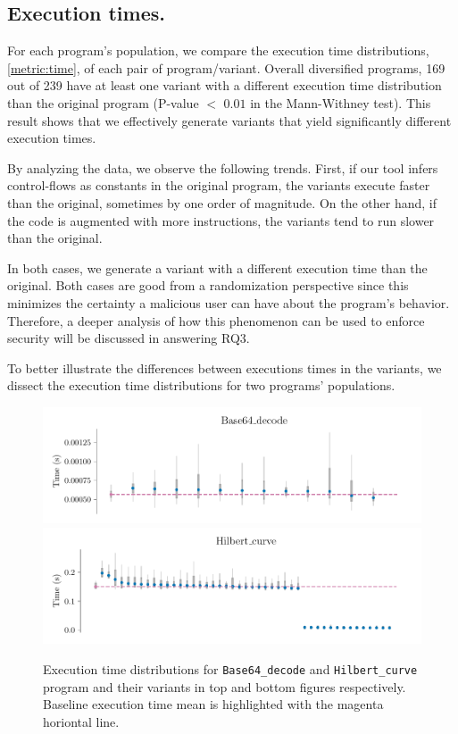 \subsection*{Execution times.}

For each program's population, we compare the execution time distributions, \autoref{metric:time}, of each pair of program/variant.
Overall diversified programs, 169 out of 239 have at least one variant with a different execution time distribution than the original program (P-value $<$ $0.01$ in the Mann-Withney test). This result shows that we effectively generate variants that yield significantly different execution times.

By analyzing the data, we observe the following trends. First, if our tool infers control-flows as constants in the original program, the variants execute faster than the original, sometimes by one order of magnitude. On the other hand, if the code is augmented with more instructions, the variants tend to run slower than the original. 

In both cases, we generate a variant with a different execution time than the original. Both cases are good from a randomization perspective since this minimizes the certainty a malicious user can have about the program's behavior. Therefore, a deeper analysis of how this phenomenon can be used to enforce security will be discussed in answering RQ3.

To better illustrate the differences between executions times in the variants, we dissect the execution time distributions for two programs' populations. 


\begin{figure}[h]
    \centering
    \includegraphics[width=\linewidth]{plots/base64.pdf}
    \includegraphics[width=\linewidth]{plots/hilbert_curve.pdf}
    \caption{Execution time distributions for \texttt{Base64\_decode} and \texttt{Hilbert\_curve} program and their variants in top and bottom figures respectively. Baseline execution time mean is highlighted with the magenta horiontal line. }
    \label{rq3:perf}
\end{figure}


